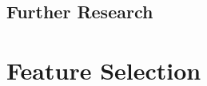\documentclass[11pt, a4paper, english]{book}
\begin{document}

\section{Further Research}


\listoffigures
\listoftables

\newpage



\appendix
\chapter{Feature Selection}
\label{chap:feature_selection}

\end{document}
